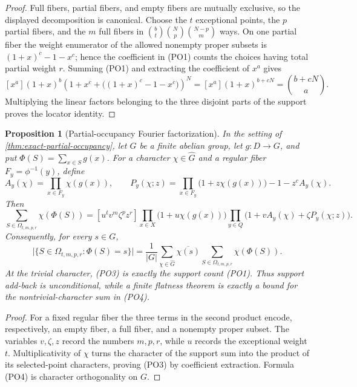 \documentclass[12pt,a4paper]{amsart}
\numberwithin{equation}{section}
\newtheorem{proposition}[proposition]{Proposition}
\theoremstyle{remark}
\newcommand{\abs}[1]{\lvert #1\rvert}
\begin{document}
\begin{proof}
Full fibers, partial fibers, and empty fibers are mutually exclusive, so
the displayed decomposition is canonical.  Choose the \(t\) exceptional
points, the \(p\) partial fibers, and the \(m\) full fibers in
\(\binom bt\binom Np\binom{N-p}m\) ways.  On one partial fiber the
weight enumerator of the allowed nonempty proper subsets is
\((1+x)^c-1-x^c\); hence the coefficient in \textup{(PO1)} counts the
choices having total partial weight \(r\).  Summing \textup{(PO1)} and
extracting the coefficient of \(x^a\) gives
\[
 [x^a](1+x)^b
 \left(1+x^c+\bigl((1+x)^c-1-x^c\bigr)\right)^N
 =[x^a](1+x)^{b+cN}=\binom{b+cN}{a}.
\]
Multiplying the linear factors belonging to the three disjoint parts of
the support proves the locator identity.
\end{proof}

\begin{proposition}[Partial-occupancy Fourier factorization]
\label{prop:partial-occupancy-fourier}
In the setting of \cref{thm:exact-partial-occupancy}, let \(G\) be a
finite abelian group, let \(g:D\to G\), and put
\(\Phi(S)=\sum_{x\in S}g(x)\).  For a character
\(\chi\in\widehat G\) and a regular fiber \(F_y=\phi^{-1}(y)\), define
\[
 A_y(\chi)=\prod_{x\in F_y}\chi(g(x)),\qquad
 P_y(\chi;z)=
 \prod_{x\in F_y}\bigl(1+z\chi(g(x))\bigr)-1-z^cA_y(\chi).
\]
Then
\[
 \sum_{S\in\Omega_{t,m,p,r}}\chi(\Phi(S))
 =[u^tv^m\zeta^pz^r]
 \prod_{x\in X}\bigl(1+u\chi(g(x))\bigr)
 \prod_{y\in Q}
 \bigl(1+vA_y(\chi)+\zeta P_y(\chi;z)\bigr).          \tag{PO3}
\]
Consequently, for every \(s\in G\),
\[
 \abs{\{S\in\Omega_{t,m,p,r}:\Phi(S)=s\}}
 =\frac1{\abs G}\sum_{\chi\in\widehat G}
   \overline{\chi(s)}
   \sum_{S\in\Omega_{t,m,p,r}}\chi(\Phi(S)).         \tag{PO4}
\]
At the trivial character, \textup{(PO3)} is exactly the support count
\textup{(PO1)}.  Thus support add-back is unconditional, while a finite
flatness theorem is exactly a bound for the nontrivial-character sum in
\textup{(PO4)}.
\end{proposition}

\begin{proof}
For a fixed regular fiber the three terms in the second product encode,
respectively, an empty fiber, a full fiber, and a nonempty proper subset.
The variables \(v,\zeta,z\) record the numbers \(m,p,r\), while \(u\)
records the exceptional weight \(t\).  Multiplicativity of \(\chi\) turns
the character of the support sum into the product of its selected-point
characters, proving \textup{(PO3)} by coefficient extraction.
Formula \textup{(PO4)} is character orthogonality on \(G\).
\end{proof}
\end{document}
